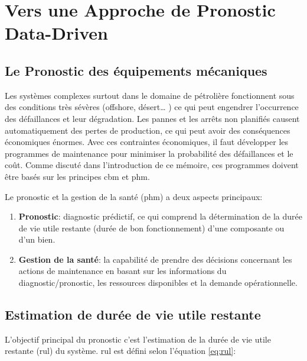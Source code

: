 \chapter{Vers une Approche de Pronostic Data-Driven}


\section{Le Pronostic des équipements mécaniques}
Les systèmes complexes surtout dans le domaine de pétrolière fonctionnent sous des conditions très sévères (offshore, désert… ) ce qui peut engendrer l’occurrence des défaillances et leur dégradation. Les pannes et les arrêts non planifiés causent automatiquement des pertes de production, ce qui peut avoir des conséquences économiques énormes. Avec ces contraintes économiques, il faut développer les programmes de maintenance pour minimiser la probabilité des défaillances et le coût. Comme discuté dans l'introduction de ce mémoire, ces programmes doivent être basés sur les principes \acrlong{cbm} et \acrlong{phm}.

Le pronostic et la gestion de la santé (\acrlong{phm}) a deux aspects principaux\cite{Hess2008}:

\begin{enumerate}
    \item \textbf{Pronostic}: diagnostic prédictif, ce qui comprend la détermination de la durée de vie utile restante (durée de bon fonctionnement) d'une composante ou d'un bien.
    \item \textbf{Gestion de la santé}: la capabilité de prendre des décisions concernant les actions de maintenance en basant sur les informations du diagnostic/pronostic, les ressources disponibles et la demande opérationnelle.
\end{enumerate}

\section{Estimation de durée de vie utile restante}
\label{section:rul}
\label{section:rul-estimation}
L'objectif principal du pronostic c'est l'estimation de la durée de vie utile restante (\acrlong{rul}) du système.
\acrshort{rul} est défini selon l'équation \ref{eq:rul}:


